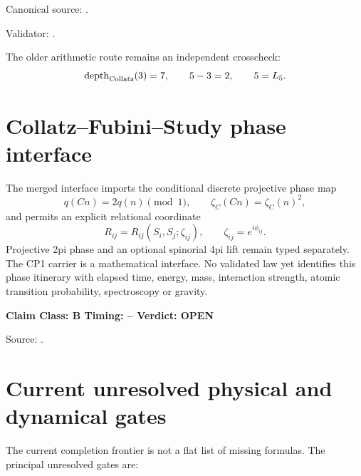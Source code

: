 \documentclass[11pt,a4paper,twoside]{book}
\def\({}%
\def\){}%
\def\pi{pi}%
\theoremstyle{definition}
\newcommand{\vTwelveStatus}[3]{\par\noindent\textbf{Claim Class: #1 \quad Timing: #2 \quad Verdict: #3}\par}
\begin{document}
Canonical source:
.

Validator:
.

The older arithmetic route remains an independent crosscheck:
\[
\operatorname{depth}_{\rm Collatz}(3)=7,
\qquad 5-3=2,
\qquad 5=L_5.
\]

\section{Collatz--Fubini--Study phase interface}

The merged interface imports the conditional discrete projective phase map
\[
q(Cn)=2q(n)\pmod1,
\qquad
\boxed{\zeta_C(Cn)=\zeta_C(n)^2},
\]
and permits an explicit relational coordinate
\[
R_{ij}=R_{ij}(S_i,S_j;\zeta_{ij}),
\qquad \zeta_{ij}=e^{i\phi_{ij}}.
\]
Projective \(2\pi\) phase and an optional spinorial \(4\pi\) lift remain typed
separately.  The CP1 carrier is a mathematical interface.  No validated law yet
identifies this phase itinerary with elapsed time, energy, mass, interaction
strength, atomic transition probability, spectroscopy or gravity.
\vTwelveStatus{B}{--}{OPEN}

Source:
.

\section{Current unresolved physical and dynamical gates}

The current completion frontier is not a flat list of missing formulas.  The
principal unresolved gates are:
\end{document}
